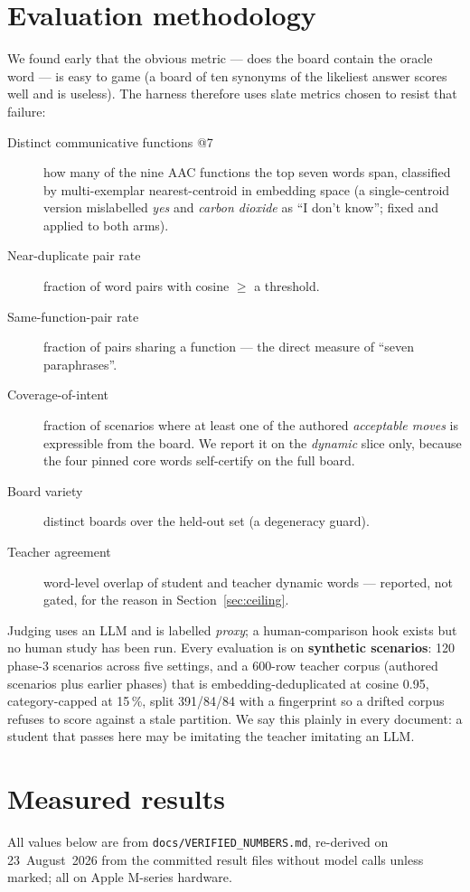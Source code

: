 \documentclass[11pt]{article}
\newcommand{\file}[1]{\texttt{\small #1}}
\begin{document}
\section{Evaluation methodology}
\label{sec:eval}
We found early that the obvious metric --- does the board contain the oracle
word --- is easy to game (a board of ten synonyms of the likeliest answer scores
well and is useless). The harness therefore uses slate metrics chosen to resist
that failure:
\begin{description}
\item[Distinct communicative functions @7] how many of the nine AAC functions the top seven words span, classified by multi-exemplar nearest-centroid in embedding space (a single-centroid version mislabelled \emph{yes} and \emph{carbon dioxide} as ``I don't know''; fixed and applied to both arms).
\item[Near-duplicate pair rate] fraction of word pairs with cosine $\ge$ a threshold.
\item[Same-function-pair rate] fraction of pairs sharing a function --- the direct measure of ``seven paraphrases''.
\item[Coverage-of-intent] fraction of scenarios where at least one of the authored \emph{acceptable moves} is expressible from the board. We report it on the \emph{dynamic} slice only, because the four pinned core words self-certify on the full board.
\item[Board variety] distinct boards over the held-out set (a degeneracy guard).
\item[Teacher agreement] word-level overlap of student and teacher dynamic words --- reported, not gated, for the reason in Section~\ref{sec:ceiling}.
\end{description}
Judging uses an LLM and is labelled \emph{proxy}; a human-comparison hook exists
but no human study has been run. Every evaluation is on \textbf{synthetic
scenarios}: 120 phase-3 scenarios across five settings, and a 600-row teacher
corpus (authored scenarios plus earlier phases) that is embedding-deduplicated
at cosine 0.95, category-capped at 15\,\%, split 391/84/84 with a fingerprint
so a drifted corpus refuses to score against a stale partition. We say this
plainly in every document: a student that passes here may be imitating the
teacher imitating an LLM.

\section{Measured results}
All values below are from \file{docs/VERIFIED\_NUMBERS.md}, re-derived on
23~August~2026 from the committed result files without model calls unless
marked; all on Apple M-series hardware.
\end{document}
